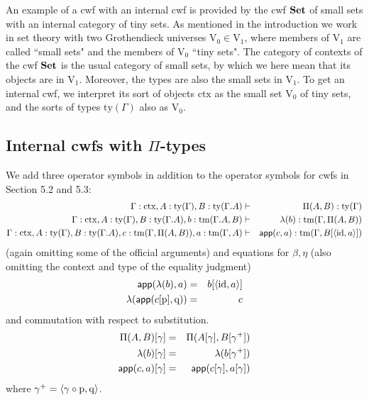 \documentclass{lmcs}
\newcommand{\FYI}[1]{{\color{red}#1}}
\def\V{\mathrm{V}}
\def\id{\mathrm{id}}
\newcommand{\ctx}{\mathrm{ctx}}
\newcommand{\ty}{\mathrm{ty}}
\newcommand{\tm}{\mathrm{tm}}
\begin{document}
An example of a cwf with an internal cwf is provided by the cwf ${\bf Set}$ of small sets with an internal category of tiny sets. As mentioned in the introduction we work in set theory with two Grothendieck universes $\V_0 \in \V_1$, where members of $\V_1$ are called ``small sets" and the members of $\V_0$ ``tiny sets". The category of contexts of the cwf ${\bf Set}$ is the usual category of small sets, by which we here mean that its objects are in $\V_1$. Moreover, the types are also the small sets in $\V_1$. To get an internal cwf, we interpret its sort of objects $\ctx$ as the small set $\V_0$ of tiny sets, and the sorts of types $\ty(\Gamma)$ also as $\V_0$.



\subsection{Internal cwfs with $\Pi$-types}
We add three operator symbols in addition to the operator symbols for cwfs in Section 5.2 and 5.3:
\begin{eqnarray*}
\Gamma : \ctx, A : \ty(\Gamma), B : \ty(\Gamma.A)&\vdash& \Pi(A,B) : \ty(\Gamma)\\
\Gamma : \ctx, A : \ty(\Gamma), B : \ty(\Gamma.A), b : \tm(\Gamma.A, B) &\vdash& \lambda(b) : \tm(\Gamma,\Pi(A,B))\\
\Gamma : \ctx, A : \ty(\Gamma), B : \ty(\Gamma.A), c :  \tm(\Gamma,\Pi(A,B)), a : \tm(\Gamma, A) &\vdash& \app(c,a) : \tm(\Gamma, B[\tuple{\id,a}])
\end{eqnarray*}
(again omitting some of the official arguments)
and equations for $\beta, \eta$ (also omitting the context and type of the equality judgment)
 \begin{eqnarray*}
 \app(\lambda(b),a) &=& b[\tuple{\id,a}]\\
 \lambda(\app(c[\p],\q)) &=& c
\end{eqnarray*}
and commutation with respect to substitution.
\begin{eqnarray*}
\Pi(A,B)[ \gamma ] &=& \Pi(A [ \gamma ], B[ \gamma^+ ])\\
\lambda(b) [ \gamma ] &=& \lambda(b[\gamma^+ ])\\
\mathsf{app}(c,a) [ \gamma ] &=& \mathsf{app}(c[ \gamma ], a[ \gamma ] )
\end{eqnarray*}
where $\gamma^+ = \langle \gamma \circ \mathrm{p}, \mathrm{q} \rangle$.
\end{document}
